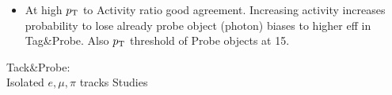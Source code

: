 \documentclass{beamer}
\begin{document}
\begin{frame}
\begin{columns}
\begin{column}{0.33\textwidth}
   \end{column}
  \end{columns}
\begin{itemize}
 \item At high $p_{\text{T}}$ to Activity ratio good agreement. Increasing activity increases probability to lose already probe object (photon) biases to higher eff in Tag\&Probe. Also $p_{\text{T}}$ threshold of Probe objects at 15\gev.
\end{itemize}

\end{frame}


\begin{frame}
 \begin{block}{}
 \centering
 \Large Tack\&Probe:\\Isolated $e,\mu,\pi$ tracks Studies
 \end{block}
\end{frame}
\end{document}
